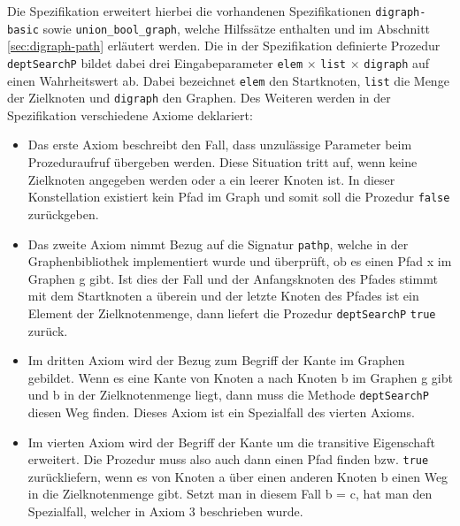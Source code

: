 Die Spezifikation erweitert hierbei die vorhandenen Spezifikationen \texttt{digraph-basic} sowie \texttt{union\_bool\_graph}, welche Hilfssätze enthalten und im Abschnitt \ref{sec:digraph-path} erläutert werden.
Die in der Spezifikation definierte Prozedur \texttt{deptSearchP} bildet dabei drei Eingabeparameter \texttt{elem} $\times$ \texttt{list} $\times$ \texttt{digraph} auf einen Wahrheitswert ab.
Dabei bezeichnet \texttt{elem} den Startknoten, \texttt{list} die Menge der Zielknoten und \texttt{digraph} den Graphen.
Des Weiteren werden in der Spezifikation verschiedene Axiome deklariert:\\
\begin{itemize}
\item Das erste Axiom beschreibt den Fall, dass unzulässige Parameter beim Prozeduraufruf übergeben werden. Diese Situation tritt auf, wenn keine Zielknoten angegeben werden oder a ein leerer Knoten ist. In dieser Konstellation existiert kein Pfad im Graph und somit soll die Prozedur \texttt{false} zurückgeben.  
\item Das zweite Axiom nimmt Bezug auf die Signatur \texttt{pathp}, welche in der Graphenbibliothek implementiert wurde und überprüft, ob es einen Pfad x im Graphen g gibt. Ist dies der Fall und der Anfangsknoten des Pfades stimmt mit dem Startknoten a überein und der letzte Knoten des Pfades ist ein Element der Zielknotenmenge, dann liefert die Prozedur \texttt{deptSearchP} \texttt{true} zurück.
\item Im dritten Axiom wird der Bezug zum Begriff der Kante im Graphen gebildet. Wenn es eine Kante von Knoten a nach Knoten b im Graphen g gibt und b in der Zielknotenmenge liegt, dann muss die Methode \texttt{deptSearchP} diesen Weg finden. Dieses Axiom ist ein Spezialfall des vierten Axioms.
\item Im vierten Axiom wird der Begriff der Kante um die transitive Eigenschaft erweitert. Die Prozedur muss also auch dann einen Pfad finden bzw. \texttt{true} zurückliefern, wenn es von Knoten a über einen anderen Knoten b einen Weg in die Zielknotenmenge gibt. Setzt man in diesem Fall b = c, hat man den Spezialfall, welcher in Axiom 3 beschrieben wurde. 
\end{itemize}





